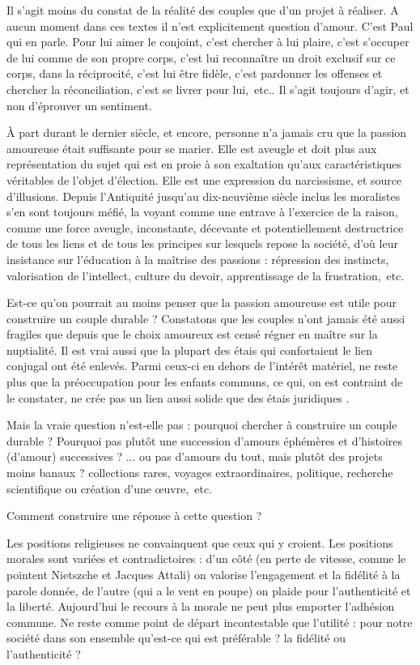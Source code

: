 Il s'agit moins du constat de la réalité des couples que d'un projet à réaliser. A aucun moment dans ces textes il n'est explicitement question d'amour.  C'est Paul qui en parle. Pour lui aimer le conjoint, c'est chercher à lui plaire,  c'est s'occuper de lui comme de son propre corps, c'est lui reconnaître un droit exclusif sur ce corps, dans la réciprocité, c'est lui être fidèle, c'est pardonner les offenses et chercher la réconciliation, c'est se livrer pour lui,~etc.. Il s'agit toujours d'agir, et non d'éprouver un sentiment. 

À part durant le dernier siècle, et encore, personne n'a jamais cru que la passion amoureuse était suffisante pour se marier. Elle est aveugle et doit plus aux représentation du sujet qui est en proie à son exaltation qu'aux caractéristiques véritables de l'objet d'élection. Elle est une expression du narcissisme, et source d'illusions. Depuis l'Antiquité jusqu'au dix-neuvième siècle inclus les moralistes s'en sont toujours méfié, la voyant comme une entrave à l'exercice de la raison, comme une force aveugle, inconstante, décevante et potentiellement destructrice de tous les liens et de tous les principes sur lesquels repose la société, d'où leur insistance sur l'éducation à la maîtrise des passions : répression des instincts, valorisation de l'intellect, culture du devoir, apprentissage de la frustration,~etc.
 
 Est-ce qu'on pourrait au moins penser que la passion amoureuse est utile pour construire un couple durable ? Constatons que les couples n'ont jamais été aussi fragiles que depuis que le choix amoureux est censé régner en maître sur la nuptialité. Il est vrai aussi que la plupart des étais qui confortaient le lien conjugal ont été enlevés. Parmi ceux-ci en dehors de l'intérêt matériel, ne reste plus que la préoccupation pour les enfants communs, ce qui, on est contraint de le constater,  ne crée pas un lien aussi solide que des étais juridiques .
 
 Mais la vraie question n'est-elle pas : pourquoi chercher à construire un couple durable ? Pourquoi pas plutôt une succession d'amours éphémères et d'histoires (d'amour) successives ?
 ... ou pas d'amours du tout, mais plutôt des projets moins banaux ? collections rares, voyages extraordinaires, politique, recherche scientifique ou création d'une œuvre,~etc.
 
Comment construire une réponse à cette question ?

Les positions religieuses ne convainquent que ceux qui y croient. Les positions morales sont variées et contradictoires : d'un côté (en perte de vitesse, comme le pointent Nietszche et Jacques Attali) on valorise l'engagement et la fidélité à la parole donnée, de l'autre (qui a le vent en poupe) on plaide pour l'authenticité et la liberté. Aujourd'hui le recours à la morale ne peut plus emporter l'adhésion commune. Ne reste comme point de départ incontestable que l'utilité : pour notre société dans son ensemble qu'est-ce qui est préférable ? la fidélité ou l'authenticité ?

